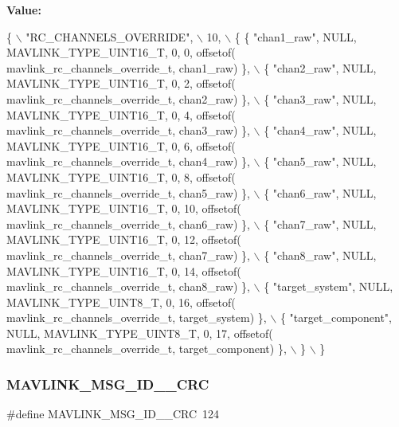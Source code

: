 {\bfseries Value\+:}
\begin{DoxyCode}
\{ \(\backslash\)
    \textcolor{stringliteral}{"RC\_CHANNELS\_OVERRIDE"}, \(\backslash\)
    10, \(\backslash\)
    \{  \{ \textcolor{stringliteral}{"chan1\_raw"}, NULL, MAVLINK_TYPE_UINT16_T, 0, 0, offsetof(
      mavlink_rc_channels_override_t, chan1\_raw) \}, \(\backslash\)
         \{ \textcolor{stringliteral}{"chan2\_raw"}, NULL, MAVLINK_TYPE_UINT16_T, 0, 2, offsetof(
      mavlink_rc_channels_override_t, chan2\_raw) \}, \(\backslash\)
         \{ \textcolor{stringliteral}{"chan3\_raw"}, NULL, MAVLINK_TYPE_UINT16_T, 0, 4, offsetof(
      mavlink_rc_channels_override_t, chan3\_raw) \}, \(\backslash\)
         \{ \textcolor{stringliteral}{"chan4\_raw"}, NULL, MAVLINK_TYPE_UINT16_T, 0, 6, offsetof(
      mavlink_rc_channels_override_t, chan4\_raw) \}, \(\backslash\)
         \{ \textcolor{stringliteral}{"chan5\_raw"}, NULL, MAVLINK_TYPE_UINT16_T, 0, 8, offsetof(
      mavlink_rc_channels_override_t, chan5\_raw) \}, \(\backslash\)
         \{ \textcolor{stringliteral}{"chan6\_raw"}, NULL, MAVLINK_TYPE_UINT16_T, 0, 10, offsetof(
      mavlink_rc_channels_override_t, chan6\_raw) \}, \(\backslash\)
         \{ \textcolor{stringliteral}{"chan7\_raw"}, NULL, MAVLINK_TYPE_UINT16_T, 0, 12, offsetof(
      mavlink_rc_channels_override_t, chan7\_raw) \}, \(\backslash\)
         \{ \textcolor{stringliteral}{"chan8\_raw"}, NULL, MAVLINK_TYPE_UINT16_T, 0, 14, offsetof(
      mavlink_rc_channels_override_t, chan8\_raw) \}, \(\backslash\)
         \{ \textcolor{stringliteral}{"target\_system"}, NULL, MAVLINK_TYPE_UINT8_T, 0, 16, offsetof(
      mavlink_rc_channels_override_t, target\_system) \}, \(\backslash\)
         \{ \textcolor{stringliteral}{"target\_component"}, NULL, MAVLINK_TYPE_UINT8_T, 0, 17, offsetof(
      mavlink_rc_channels_override_t, target\_component) \}, \(\backslash\)
         \} \(\backslash\)
\}
\end{DoxyCode}
\mbox{\label{mavlink__msg__rc__channels__override_8h_ae1f24220bafeb98b71c947f19abfecf0}} 
\subsubsection{M\+A\+V\+L\+I\+N\+K\+\_\+\+M\+S\+G\+\_\+\+I\+D\+\_\+\_\+\+C\+RC}
{\footnotesize\ttfamily \#define M\+A\+V\+L\+I\+N\+K\+\_\+\+M\+S\+G\+\_\+\+I\+D\+\_\+\_\+\+C\+RC~124}

